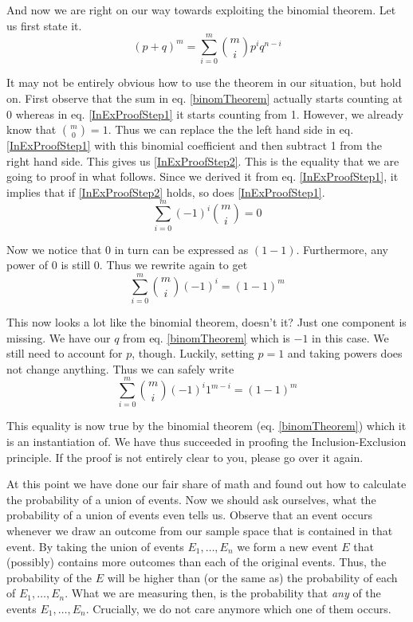 \documentclass[a4paper,11pt,leqno]{report}
\begin{document}
And now we are right on our way towards exploiting the binomial theorem. Let us first state it.
\begin{equation} \label{binomTheorem}
(p + q)^{m} = \underset{i=0}{\overset{m}{\sum}} \binom{m}{i} p^{i}q^{n-i} 
\end{equation}

It may not be entirely obvious how to use the theorem in our situation, but hold on. First observe
that the sum in eq. \ref{binomTheorem} actually starts counting at 0 whereas in eq. \ref{InExProofStep1}
it starts counting from 1. However, we already know that $ \binom{m}{0} = 1 $. Thus we can replace the
the left hand side in eq. \ref{InExProofStep1} with this binomial coefficient and then subtract 1 from the
right hand side. This gives us \ref{InExProofStep2}. This is the equality that we are going to proof
in what follows. Since we derived it from eq. \ref{InExProofStep1}, it implies that if \ref{InExProofStep2}
holds, so does \ref{InExProofStep1}.
\begin{equation} \label{InExProofStep2}
\underset{i=0}{\overset{m}{\sum}}(-1)^{i}\binom{m}{i} = 0
\end{equation} 

Now we notice that $ 0 $ in turn can be expressed as $ (1-1) $. Furthermore, any power of 0 is still 0.
Thus we rewrite again to get
\begin{equation}
\underset{i=0}{\overset{m}{\sum}}\binom{m}{i}(-1)^{i} = (1-1)^{m}
\end{equation}

This now looks a lot like the binomial theorem, doesn't it? Just one component is missing. We have
our $ q $ from eq. \ref{binomTheorem} which is $ -1 $ in this case. We still need to account for 
$ p $, though. Luckily, setting $ p=1 $ and taking powers does not change anything. Thus we can safely write
\begin{equation}
\underset{i=0}{\overset{m}{\sum}}\binom{m}{i}(-1)^{i}1^{m-i} = (1-1)^{m}
\end{equation} 

This equality is now true by the binomial theorem (eq. \ref{binomTheorem}) which it is an instantiation of.
We have thus succeeded in proofing the Inclusion-Exclusion principle. If the proof is not entirely
clear to you, please go over it again.

At this point we have done our fair share of math and found out how to calculate the probability of a union
of events. Now we should ask ourselves, what the probability of a union of events even tells us. Observe that an event 
occurs whenever we draw an outcome from our sample space that is contained in that event. By taking the union
of events $ E_{1}, \ldots, E_{n} $ we form a new event $ E $ that (possibly) contains more outcomes than each 
of the original events. Thus, the probability of the $ E $ will be higher than (or the same as) the 
probability of each of $ E_{1}, \ldots, E_{n} $. What we are measuring then, is the probability that 
\textit{any} of the events $ E_{1}, \ldots, E_{n} $. Crucially, we do not care anymore which one of them
occurs.
\end{document}
